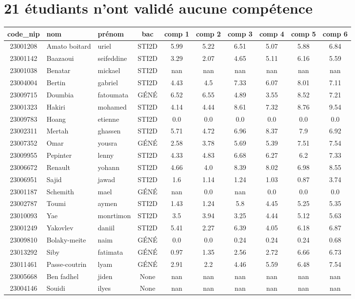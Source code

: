 \documentclass{article}%
\begin{document}
\section*{21 étudiants n'ont validé aucune compétence}%
\label{sec:21tudiantsnontvalidaucunecomptence}%
\begin{tabular}{|c|l|l|c|c|c|c|c|c|c|}%
\hline%
\rowcolor{jaune}%
code\_nip&nom&prénom&bac&comp 1&comp 2&comp 3&comp 4&comp 5&comp 6\\%
\hline%
23001208&Amato boitard&uriel&STI2D&5.99&5.22&6.51&5.07&5.88&6.84\\%
\hline%
23001142&Baazaoui&seifeddine&STI2D&3.29&2.07&4.65&5.11&6.16&5.59\\%
\hline%
23001038&Benatar&mickael&STI2D&nan&nan&nan&nan&nan&nan\\%
\hline%
23004004&Bertin&gabriel&STI2D&4.43&4.5&7.33&6.07&8.01&7.11\\%
\hline%
23009715&Doumbia&fatoumata&GÉNÉ&6.52&6.55&4.89&3.55&8.52&7.21\\%
\hline%
23001323&Hakiri&mohamed&STI2D&4.14&4.44&8.61&7.32&8.76&9.54\\%
\hline%
23009783&Hoang&etienne&STI2D&0.0&0.0&0.0&0.0&0.0&0.0\\%
\hline%
23002311&Mertah&ghassen&STI2D&5.71&4.72&6.96&8.37&7.9&6.92\\%
\hline%
23007352&Omar&yousra&GÉNÉ&2.58&3.78&5.69&5.39&7.51&7.54\\%
\hline%
23009955&Pepinter&lenny&STI2D&4.33&4.83&6.68&6.27&6.2&7.33\\%
\hline%
23006672&Renault&yohann&STI2D&4.66&4.0&8.39&8.02&6.98&8.55\\%
\hline%
23006951&Sajid&jawad&STI2D&1.6&1.14&1.24&1.03&0.87&3.74\\%
\hline%
23001187&Schemith&mael&GÉNÉ&nan&0.0&nan&0.0&0.0&0.0\\%
\hline%
23002787&Toumi&aymen&STI2D&1.43&1.24&5.8&4.45&5.25&5.35\\%
\hline%
23010093&Yae&monrtimon&STI2D&3.5&3.94&3.25&4.44&5.12&5.63\\%
\hline%
23001249&Yakovlev&daniil&STI2D&5.41&2.27&6.39&4.05&6.18&6.87\\%
\hline%
23009810&Bolaky{-}meite&naim&GÉNÉ&0.0&0.0&0.24&0.24&0.24&0.68\\%
\hline%
23013292&Siby&fatimata&GÉNÉ&0.97&1.35&2.56&2.72&6.66&6.73\\%
\hline%
23011461&Passe{-}coutrin&lyam&GÉNÉ&2.91&2.2&4.46&5.59&6.48&7.54\\%
\hline%
23005668&Ben fadhel&jiden&None&nan&nan&nan&nan&nan&nan\\%
\hline%
23004146&Souidi&ilyes&None&nan&nan&nan&nan&nan&nan\\%
\hline%
\end{tabular}
\end{document}
